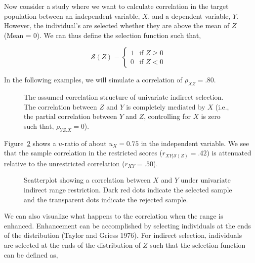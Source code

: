 \documentclass[
  letterpaper,
  DIV=11,
  numbers=noendperiod]{scrreprt}
\begin{document}
Now consider a study where we want to calculate correlation in the
target population between an independent variable, \(X\), and a
dependent variable, \(Y\). However, the individual's are selected
whether they are above the mean of \(Z\) (Mean = 0). We can thus define
the selection function such that,

\[
\mathcal{S}(Z) = \begin{cases} 1 & \text{if } Z \geq 0 \\ 0 & \text{if } Z < 0 \end{cases}
\]

In the following examples, we will simulate a correlation of
\(\rho_{XZ}=.80\).

\begin{figure}[H]


\caption{\label{fig-corr-model-uni}The assumed correlation structure of
univariate indirect selection. The correlation between \(Z\) and \(Y\)
is completely mediated by \(X\) (i.e., the partial correlation between
\(Y\) and \(Z\), controlling for \(X\) is zero such that,
\(\rho_{YZ.X}=0\)).}

\end{figure}%

Figure~\ref{fig-uvirr} shows a \(u\)-ratio of about \(u_X=0.75\) in the
independent variable. We see that the sample correlation in the
restricted scores (\(r_{XY|\mathcal{S}(Z)}=.42\)) is attenuated relative
to the unrestricted correlation (\(r_{XY}=.50\)).

\begin{figure}[H]


\caption{\label{fig-uvirr}Scatterplot showing a correlation between
\(X\) and \(Y\) under univariate indirect range restriction. Dark red
dots indicate the selected sample and the transparent dots indicate the
rejected sample.}

\end{figure}%

We can also visualize what happens to the correlation when the range is
enhanced. Enhancement can be accomplished by selecting individuals at
the ends of the distribution (Taylor and Griess 1976). For indirect
selection, individuals are selected at the ends of the distribution of
\(Z\) such that the selection function can be defined as,
\end{document}
